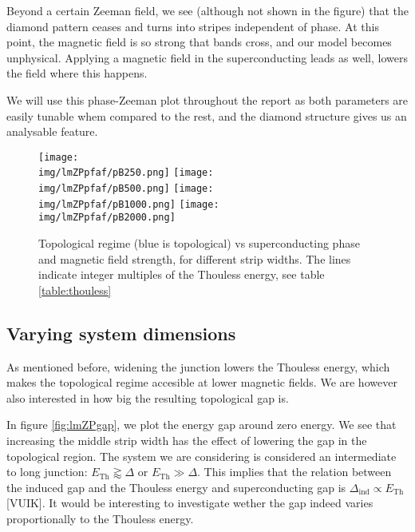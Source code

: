 \documentclass[10pt,a4paper]{article}
\newcommand{\img}{./images}
\begin{document}
		Beyond a certain Zeeman field, we see (although not shown in the figure) that the diamond pattern ceases and turns into stripes independent of phase.
		At this point, the magnetic field is so strong that bands cross, and our model becomes unphysical.
		Applying a magnetic field in the superconducting leads as well, lowers the field where this happens.
		
		We will use this phase-Zeeman plot throughout the report as both parameters are easily tunable whem compared to the rest, and the diamond structure gives us an analysable feature.
		
	\begin{figure}[H]
		\texttt{[image: \\img/lmZPpfaf/pB250.png]}
		\texttt{[image: \\img/lmZPpfaf/pB500.png]}
		\texttt{[image: \\img/lmZPpfaf/pB1000.png]}
		\texttt{[image: \\img/lmZPpfaf/pB2000.png]}
		\caption{Topological regime (blue is topological) vs superconducting phase and magnetic field strength, for different strip widths. The lines indicate integer multiples of the Thouless energy, see table \ref{table:thouless}}
		\label{fig:lmZPpfaf}
	\end{figure}

	\subsection{Varying system dimensions}
	 As mentioned before, widening the junction lowers the Thouless energy, which makes the topological regime accesible at lower magnetic fields.
	 We are however also interested in how big the resulting topological gap is.

	 
	 In figure \ref{fig:lmZPgap}, we plot the energy gap around zero energy.
	 We see that increasing the middle strip width has the effect of lowering the gap in the topological region.
	 The system we are considering is considered an intermediate to long junction: $E_\text{Th} \gtrapprox \Delta$ or $E_\text{Th} \gg \Delta$.
	 This implies that the relation between the induced gap and the Thouless energy and superconducting gap is $\Delta_\text{ind} \propto E_\text{Th}$[VUIK].
	 It would be interesting to investigate wether the gap indeed varies proportionally to the Thouless energy.
	 
\end{document}
